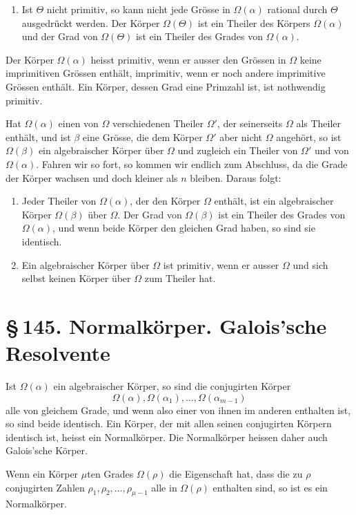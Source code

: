 \documentclass[11pt]{article}
\providecommand{\sect}[2]{\section*{\S\,#1. #2}}
\begin{document}
\begin{enumerate}[label=\arabic*.,leftmargin=2em,start=4]
\item Ist $\Theta$ nicht primitiv, so kann nicht jede Grösse in $\Omega(\alpha)$ rational durch $\Theta$ ausgedrückt werden. Der Körper $\Omega(\Theta)$ ist ein Theiler des Körpers $\Omega(\alpha)$ und der Grad von $\Omega(\Theta)$ ist ein Theiler des Grades von $\Omega(\alpha)$.
\end{enumerate}

Der Körper $\Omega(\alpha)$ heisst primitiv, wenn er ausser den Grössen in $\Omega$ keine imprimitiven Grössen enthält, imprimitiv, wenn er noch andere imprimitive Grössen enthält. Ein Körper, dessen Grad eine Primzahl ist, ist nothwendig primitiv.

Hat $\Omega(\alpha)$ einen von $\Omega$ verschiedenen Theiler $\Omega'$, der seinerseits $\Omega$ als Theiler enthält, und ist $\beta$ eine Grösse, die dem Körper $\Omega'$ aber nicht $\Omega$ angehört, so ist $\Omega(\beta)$ ein algebraischer Körper über $\Omega$ und zugleich ein Theiler von $\Omega'$ und von $\Omega(\alpha)$. Fahren wir so fort, so kommen wir endlich zum Abschluss, da die Grade der Körper wachsen und doch kleiner als $n$ bleiben. Daraus folgt:
\begin{enumerate}[label=\arabic*.,leftmargin=2em,start=5]
\item Jeder Theiler von $\Omega(\alpha)$, der den Körper $\Omega$ enthält, ist ein algebraischer Körper $\Omega(\beta)$ über $\Omega$. Der Grad von $\Omega(\beta)$ ist ein Theiler des Grades von $\Omega(\alpha)$, und wenn beide Körper den gleichen Grad haben, so sind sie identisch.
\item Ein algebraischer Körper über $\Omega$ ist primitiv, wenn er ausser $\Omega$ und sich selbst keinen Körper über $\Omega$ zum Theiler hat.
\end{enumerate}

\sect{145}{Normalkörper. Galois'sche Resolvente}

Ist $\Omega(\alpha)$ ein algebraischer Körper, so sind die conjugirten Körper
\[
        \Omega(\alpha),\Omega(\alpha_1),\ldots,\Omega(\alpha_{m-1})
\]
alle von gleichem Grade, und wenn also einer von ihnen im anderen enthalten ist, so sind beide identisch. Ein Körper, der mit allen seinen conjugirten Körpern identisch ist, heisst ein Normalkörper. Die Normalkörper heissen daher auch Galois'sche Körper.

Wenn ein Körper $\mu$ten Grades $\Omega(\rho)$ die Eigenschaft hat, dass die zu $\rho$ conjugirten Zahlen $\rho_1,\rho_2,\ldots,\rho_{\mu-1}$ alle in $\Omega(\rho)$ enthalten sind, so ist es ein Normalkörper.
\end{document}
